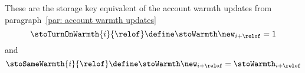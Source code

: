 \label{par: storage key warmth updates} These are the storage key equivalent of the account warmth updates from paragraph~\ref{par: account warmth updates}
\[
	\stoTurnOnWarmth
	{i}{\relof}
	\define
	\stoWarmth\new _{i + \relof} = 1
\]
and
\[
	\stoSameWarmth
	{i}{\relof}
	\define
	\stoWarmth\new _{i + \relof} = \stoWarmth _{i + \relof}
\]
